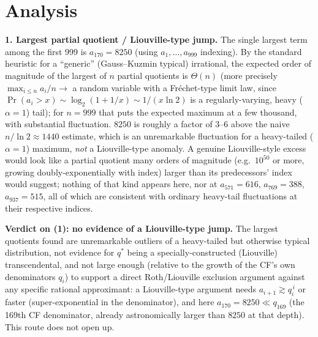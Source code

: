 \documentclass[11pt]{article}
\begin{document}
\section{Analysis}

\textbf{1. Largest partial quotient / Liouville-type jump.} The single largest term among the
first 999 is $a_{170}=8250$ (using $a_1,\ldots,a_{999}$ indexing). By the standard heuristic for
a ``generic'' (Gauss--Kuzmin typical) irrational, the expected order of magnitude of the largest
of $n$ partial quotients is $\Theta(n)$ (more precisely $\max_{i\le n}a_i/n\to$ a random variable
with a Fréchet-type limit law, since $\Pr(a_i>x)\sim \log_2(1+1/x)\sim 1/(x\ln2)$ is a
regularly-varying, heavy ($\alpha=1$) tail); for $n=999$ that puts the expected maximum at a few
thousand, with substantial fluctuation. $8250$ is roughly a factor of 3--6 above the naive
$n/\ln2\approx1440$ estimate, which is an unremarkable fluctuation for a heavy-tailed ($\alpha=1$)
maximum, \emph{not} a Liouville-type anomaly. A genuine Liouville-style excess would look like a
partial quotient many orders of magnitude (e.g.\ $10^{50}$ or more, growing doubly-exponentially
with index) larger than its predecessors' index would suggest; nothing of that kind appears here,
nor at $a_{571}=616$, $a_{769}=388$, $a_{937}=515$, all of which are consistent with ordinary
heavy-tail fluctuations at their respective indices.

\textbf{Verdict on (1): no evidence of a Liouville-type jump.} The largest quotients found are
unremarkable outliers of a heavy-tailed but otherwise typical distribution, not evidence for
$q^\ast$ being a specially-constructed (Liouville) transcendental, and not large enough (relative
to the growth of the CF's own denominators $q_i$) to support a direct Roth/Liouville exclusion
argument against any specific rational approximant: a Liouville-type argument needs
$a_{i+1}\gtrsim q_i^{\,i}$ or faster (super-exponential in the denominator), and here
$a_{170}=8250 \ll q_{169}$ (the 169th CF denominator, already astronomically larger than $8250$
at that depth). This route does not open up.
\end{document}
